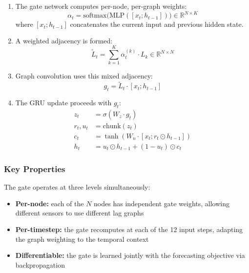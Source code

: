 \begin{enumerate}
    \item The gate network computes per-node, per-graph weights:
    \begin{equation}
    \alpha_t = \text{softmax}\big(\text{MLP}([x_t; h_{t-1}])\big) \in \mathbb{R}^{N \times K}
    \end{equation}
    where $[x_t; h_{t-1}]$ concatenates the current input and previous hidden state.

    \item A weighted adjacency is formed:
    \begin{equation}
    \tilde{L}_t = \sum_{k=1}^{K} \alpha_t^{(k)} \cdot L_k \in \mathbb{R}^{N \times N}
    \end{equation}

    \item Graph convolution uses this mixed adjacency:
    \begin{equation}
    g_t = \tilde{L}_t \cdot [x_t; h_{t-1}]
    \end{equation}

    \item The GRU update proceeds with $g_t$:
    \begin{align}
    z_t &= \sigma(W_z \cdot g_t) \\
    r_t, u_t &= \text{chunk}(z_t) \\
    c_t &= \tanh(W_n \cdot [x_t; r_t \odot h_{t-1}]) \\
    h_t &= u_t \odot h_{t-1} + (1 - u_t) \odot c_t
    \end{align}
\end{enumerate}

\subsubsection{Key Properties}

The gate operates at three levels simultaneously:
\begin{itemize}
    \item \textbf{Per-node:} each of the $N$ nodes has independent gate weights, allowing different sensors to use different lag graphs
    \item \textbf{Per-timestep:} the gate recomputes at each of the 12 input steps, adapting the graph weighting to the temporal context
    \item \textbf{Differentiable:} the gate is learned jointly with the forecasting objective via backpropagation
\end{itemize}

